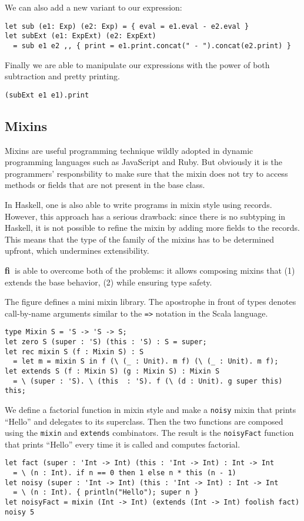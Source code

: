 \documentclass[preprint]{sigplanconf}
\newcommand{\systemfi}{{\bf fi~}}
\begin{document}
We can also add a new variant to our expression:
\begin{verbatim}
let sub (e1: Exp) (e2: Exp) = { eval = e1.eval - e2.eval }
let subExt (e1: ExpExt) (e2: ExpExt)
  = sub e1 e2 ,, { print = e1.print.concat(" - ").concat(e2.print) }
\end{verbatim}

Finally we are able to manipulate our expressions with the power of both
subtraction and pretty printing.
\begin{verbatim}
(subExt e1 e1).print
\end{verbatim}

\subsection{Mixins}

Mixins are useful programming technique wildly adopted in dynamic programming
languages such as JavaScript and Ruby. But obviously it is the programmers'
responsbility to make sure that the mixin does not try to access methods or
fields that are not present in the base class.

In Haskell, one is also able to write programs in mixin style using records.
However, this approach has a serious drawback: since there is no subtyping in
Haskell, it is not possible to refine the mixin by adding more fields to the
records. This means that the type of the family of the mixins has to be
determined upfront, which undermines extensibility.

\systemfi is able to overcome both of the problems: it allows composing mixins
that (1) extends the base behavior, (2) while ensuring type safety.

The figure defines a mini mixin library. The apostrophe in front of types
denotes call-by-name arguments similar to the \lstinline{=>} notation in the
Scala language.

\begin{lstlisting}
type Mixin S = 'S -> 'S -> S;
let zero S (super : 'S) (this : 'S) : S = super;
let rec mixin S (f : Mixin S) : S
  = let m = mixin S in f (\ (_ : Unit). m f) (\ (_ : Unit). m f);
let extends S (f : Mixin S) (g : Mixin S) : Mixin S
  = \ (super : 'S). \ (this  : 'S). f (\ (d : Unit). g super this) this;
\end{lstlisting}

We define a factorial function in mixin style and make a \lstinline{noisy} mixin
that prints ``Hello'' and delegates to its superclass. Then the two functions
are composed using the \lstinline{mixin} and \lstinline{extends} combinators.
The result is the \lstinline{noisyFact} function that prints ``Hello'' every
time it is called and computes factorial.
\begin{lstlisting}
let fact (super : 'Int -> Int) (this : 'Int -> Int) : Int -> Int
  = \ (n : Int). if n == 0 then 1 else n * this (n - 1)
let noisy (super : 'Int -> Int) (this : 'Int -> Int) : Int -> Int
  = \ (n : Int). { println("Hello"); super n }
let noisyFact = mixin (Int -> Int) (extends (Int -> Int) foolish fact)
noisy 5
\end{lstlisting}
\end{document}
